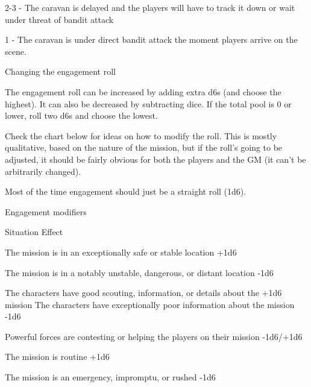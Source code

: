 2-3 - The caravan is delayed and the players will have to track it down or wait under threat of
bandit attack

1 - The caravan is under direct bandit attack the moment players arrive on the scene.


                                    Changing the engagement roll


The engagement roll can be increased by adding extra d6s (and choose the highest). It can also
be decreased by subtracting dice. If the total pool is 0 or lower, roll two d6s and choose the
lowest.


Check the chart below for ideas on how to modify the roll. This is mostly qualitative, based on
the nature of the mission, but if the roll’s going to be adjusted, it should be fairly obvious for both
the players and the GM (it can’t be arbitrarily changed).


Most of the time engagement should just be a straight roll (1d6).

                                         Engagement modifiers





 Situation                                                                             Effect

 The mission is in an exceptionally safe or stable location                            +1d6

 The mission is in a notably unstable, dangerous, or distant location                  -1d6

 The characters have good scouting, information, or details about the                  +1d6
 mission
 The characters have exceptionally poor information about the mission                  -1d6

 Powerful forces are contesting or helping the players on their mission                -1d6/+1d6

 The mission is routine                                                                +1d6

 The mission is an emergency, impromptu, or rushed                                     -1d6


